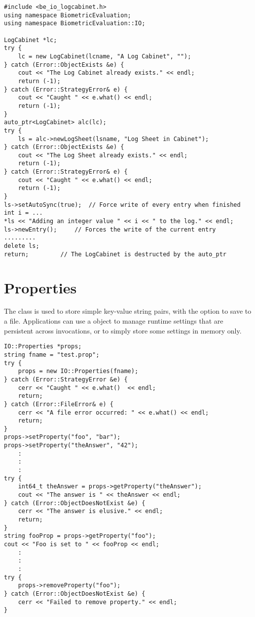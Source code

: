 \begin{lstlisting}[caption={Using a \class{LogSheet} within a \class{LogCabinet}}, label=lst:logcabinetuse]
#include <be_io_logcabinet.h>
using namespace BiometricEvaluation;
using namespace BiometricEvaluation::IO;

LogCabinet *lc;
try {
    lc = new LogCabinet(lcname, "A Log Cabinet", "");
} catch (Error::ObjectExists &e) {
    cout << "The Log Cabinet already exists." << endl;
    return (-1);
} catch (Error::StrategyError& e) {
    cout << "Caught " << e.what() << endl;
    return (-1);
}
auto_ptr<LogCabinet> alc(lc);
try {
    ls = alc->newLogSheet(lsname, "Log Sheet in Cabinet");
} catch (Error::ObjectExists &e) {
    cout << "The Log Sheet already exists." << endl;
    return (-1);
} catch (Error::StrategyError& e) {
    cout << "Caught " << e.what() << endl;
    return (-1);
}
ls->setAutoSync(true);	// Force write of every entry when finished
int i = ...
*ls << "Adding an integer value " << i << " to the log." << endl;
ls->newEntry();		// Forces the write of the current entry
.........
delete ls;
return;			// The LogCabinet is destructed by the auto_ptr
\end{lstlisting}

\section{Properties}
\label{sec-properties}
The  class is used to store simple key-value string pairs, with the
option to save to a file. Applications can use a  object to manage
runtime settings that are persistent across invocations, or to simply store
some settings in memory only.

\begin{lstlisting}[caption={Using a \class{Properties} Object}, label=lst:propertiesuse]
IO::Properties *props;
string fname = "test.prop";
try {
    props = new IO::Properties(fname);
} catch (Error::StrategyError &e) {
    cerr << "Caught " << e.what()  << endl;
    return;
} catch (Error::FileError& e) {
    cerr << "A file error occurred: " << e.what() << endl;
    return;
}
props->setProperty("foo", "bar");
props->setProperty("theAnswer", "42");
    :
    :
    :
try {
    int64_t theAnswer = props->getProperty("theAnswer");
    cout << "The answer is " << theAnswer << endl;
} catch (Error::ObjectDoesNotExist &e) {
    cerr << "The answer is elusive." << endl;
    return;
}
string fooProp = props->getProperty("foo");
cout << "Foo is set to " << fooProp << endl;
    :
    :
    :
try {
    props->removeProperty("foo");
} catch (Error::ObjectDoesNotExist &e) {
    cerr << "Failed to remove property." << endl;
}
\end{lstlisting}

